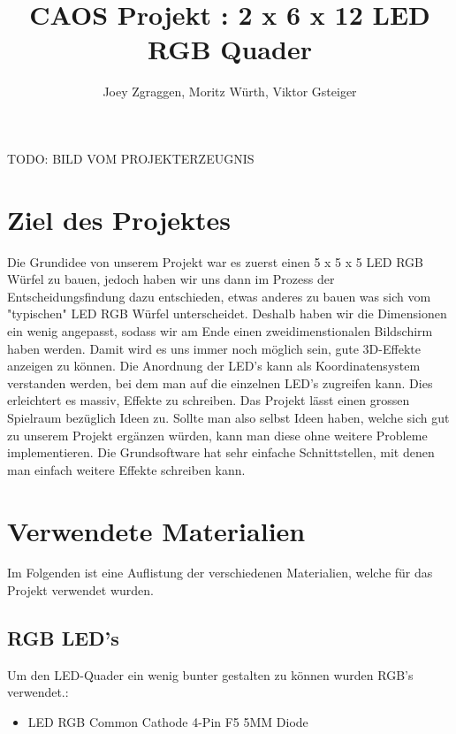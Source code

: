 \documentclass[12pt,a4paper]{article}
\title{\textbf{CAOS Projekt : 2 x 6 x 12 LED RGB Quader}}
\author{Joey Zgraggen, Moritz Würth, Viktor Gsteiger}
\begin{document}
\renewcommand\contentsname{Inhaltsverzeichnis}
\begin{titlepage}
\maketitle
TODO: BILD VOM PROJEKTERZEUGNIS
\end{titlepage}
\tableofcontents
\newpage

\section{Ziel des Projektes}

Die Grundidee von unserem Projekt war es zuerst einen 5 x 5 x 5 LED RGB Würfel zu bauen, jedoch haben wir uns dann im Prozess der Entscheidungsfindung
dazu entschieden, etwas anderes zu bauen was sich vom "typischen" LED RGB Würfel unterscheidet.
Deshalb haben wir die Dimensionen ein wenig angepasst, sodass wir am Ende einen zweidimenstionalen Bildschirm haben werden. Damit wird es uns immer noch möglich sein, gute 3D-Effekte
anzeigen zu können. Die Anordnung der LED's kann als Koordinatensystem verstanden werden, bei dem man auf die einzelnen LED's zugreifen kann. Dies erleichtert es massiv, Effekte zu schreiben. 
Das Projekt lässt einen grossen Spielraum bezüglich Ideen zu. Sollte man also selbst Ideen haben, welche sich gut zu unserem Projekt ergänzen würden, kann man diese ohne weitere
Probleme implementieren. Die Grundsoftware hat sehr einfache Schnittstellen, mit denen man einfach weitere Effekte schreiben kann.


\section{Verwendete Materialien}

Im Folgenden ist eine Auflistung der verschiedenen Materialien, welche für das Projekt verwendet wurden.

\subsection{RGB LED's}

Um den LED-Quader ein wenig bunter gestalten zu können wurden RGB's verwendet.:

\begin{itemize}
    \item LED RGB Common Cathode 4-Pin F5 5MM Diode
\end{itemize}
\end{document}
